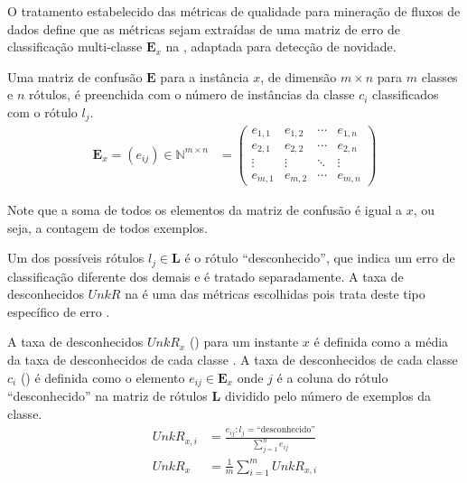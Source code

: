 O tratamento estabelecido das métricas de qualidade para mineração de fluxos de dados define
que as métricas sejam extraídas de uma matriz de erro de classificação
multi-classe $\mathbf{E}_x$ na , adaptada para detecção de
novidade.

\begin{definition}
  Uma matriz de confusão $\mathbf{E}$ para a instância $x$, de dimensão $m \times
  n$ para $m$ classes e $n$ rótulos, é preenchida com o número de instâncias da
  classe $c_i$ classificados com o rótulo $l_j$.
  \begin{align}
    \mathbf{E}_x = (e_{ij})\in \mathbb{N} ^{m\times n}
    &= \begin{pmatrix}
      e_{1,1} & e_{1,2} & \cdots & e_{1,n} \\
      e_{2,1} & e_{2,2} & \cdots & e_{2,n} \\
      \vdots  & \vdots  & \ddots & \vdots  \\
      e_{m,1} & e_{m,2} & \cdots & e_{m,n} 
    \end{pmatrix}  \label{eq:matrix}
  \end{align}
\end{definition}

Note que a soma de todos os elementos da matriz de confusão é igual a $x$, ou
seja, a contagem de todos exemplos.

Um dos possíveis rótulos $l_j \in \mathbf{L}$ é o rótulo ``desconhecido'', que
indica um erro de classificação diferente dos demais e é tratado separadamente.
A taxa de desconhecidos $\mathit{UnkR}$ na  é uma das métricas escolhidas
pois trata deste tipo específico de erro \cite{Faria2013evaluation}.

\begin{definition}
  A taxa de desconhecidos $\mathit{UnkR}_x$ () para um instante $x$ é definida como
  a média da taxa de desconhecidos de cada classe \cite{Faria2013evaluation}.
  A taxa de desconhecidos de cada classe $c_i$ () é definida como o elemento
  $e_{ij} \in \mathbf{E}_x$ onde $j$ é a coluna do rótulo ``desconhecido''
  na matriz de rótulos $\mathbf{L}$ dividido pelo número de exemplos da classe.
  \begin{align}
    \mathit{UnkR}_{x, i}
      &= \frac{e_{i j} : l_j = \text{``desconhecido''}}{\sum_{j=1}^{n} e_{i j}}
      \label{eq:unkrXI}\\
    \mathit{UnkR}_x & = \frac{1}{m} \sum_{i=1}^{m} \mathit{UnkR}_{x, i}
    \label{eq:unkr}
  \end{align}
\end{definition}

